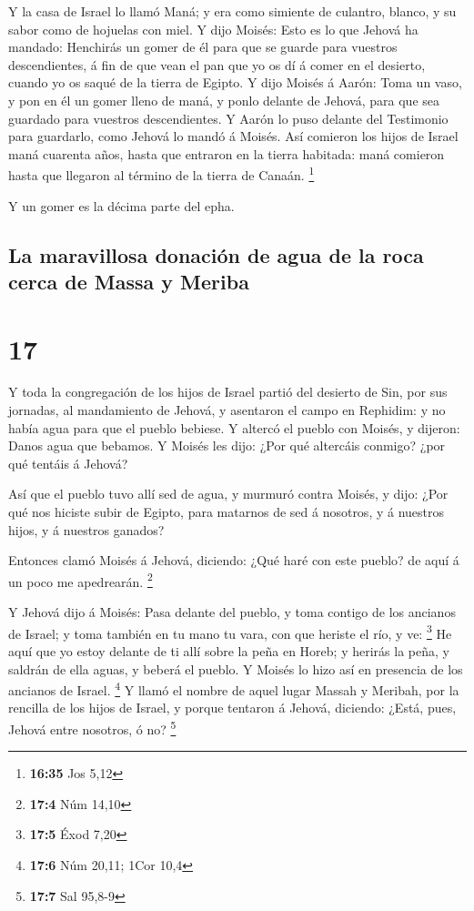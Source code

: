  Y la casa de Israel lo llamó Maná; y era como simiente de
culantro, blanco, y su sabor como de hojuelas con miel.  Y
dijo Moisés: Esto es lo que Jehová ha mandado: Henchirás un gomer de él
para que se guarde para vuestros descendientes, á fin de que vean el pan
que yo os dí á comer en el desierto, cuando yo os saqué de la tierra de
Egipto.  Y dijo Moisés á Aarón: Toma un vaso, y pon en él
un gomer lleno de maná, y ponlo delante de Jehová, para que sea guardado
para vuestros descendientes.  Y Aarón lo puso delante del
Testimonio para guardarlo, como Jehová lo mandó á Moisés. 
Así comieron los hijos de Israel maná cuarenta años, hasta que entraron
en la tierra habitada: maná comieron hasta que llegaron al término de la
tierra de Canaán. \footnote{\textbf{16:35} Jos 5,12}

 Y un gomer es la décima parte del epha.

\hypertarget{la-maravillosa-donaciuxf3n-de-agua-de-la-roca-cerca-de-massa-y-meriba}{%
\subsection{La maravillosa donación de agua de la roca cerca de Massa y
Meriba}\label{la-maravillosa-donaciuxf3n-de-agua-de-la-roca-cerca-de-massa-y-meriba}}

\hypertarget{section-16}{%
\section{17}\label{section-16}}

 Y toda la congregación de los hijos de Israel partió del
desierto de Sin, por sus jornadas, al mandamiento de Jehová, y asentaron
el campo en Rephidim: y no había agua para que el pueblo bebiese.
 Y altercó el pueblo con Moisés, y dijeron: Danos agua que
bebamos. Y Moisés les dijo: ¿Por qué altercáis conmigo? ¿por qué tentáis
á Jehová?

 Así que el pueblo tuvo allí sed de agua, y murmuró contra
Moisés, y dijo: ¿Por qué nos hiciste subir de Egipto, para matarnos de
sed á nosotros, y á nuestros hijos, y á nuestros ganados?

 Entonces clamó Moisés á Jehová, diciendo: ¿Qué haré con
este pueblo? de aquí á un poco me apedrearán. \footnote{\textbf{17:4}
  Núm 14,10}

 Y Jehová dijo á Moisés: Pasa delante del pueblo, y toma
contigo de los ancianos de Israel; y toma también en tu mano tu vara,
con que heriste el río, y ve: \footnote{\textbf{17:5} Éxod 7,20}
 He aquí que yo estoy delante de ti allí sobre la peña en
Horeb; y herirás la peña, y saldrán de ella aguas, y beberá el pueblo. Y
Moisés lo hizo así en presencia de los ancianos de Israel. \footnote{\textbf{17:6}
  Núm 20,11; 1Cor 10,4}  Y llamó el nombre de aquel lugar
Massah y Meribah, por la rencilla de los hijos de Israel, y porque
tentaron á Jehová, diciendo: ¿Está, pues, Jehová entre nosotros, ó no?
\footnote{\textbf{17:7} Sal 95,8-9}

